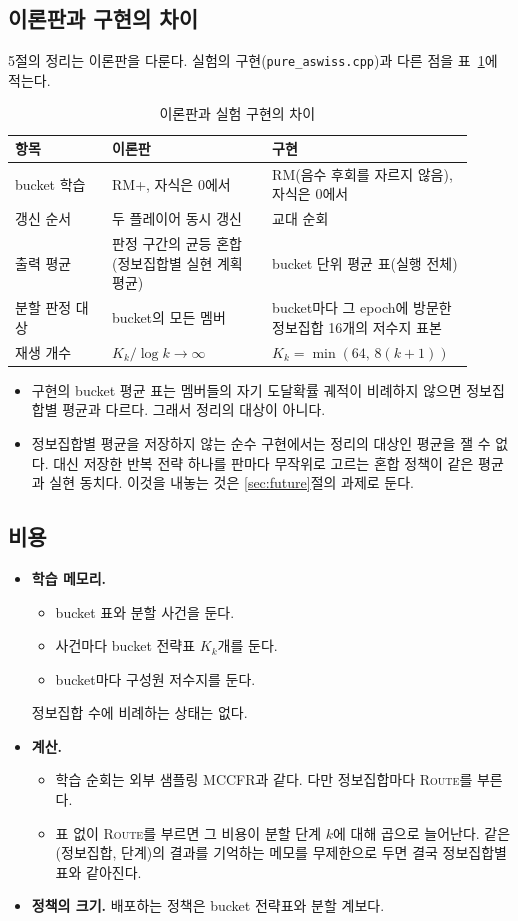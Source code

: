 \subsection{이론판과 구현의 차이}\label{sec:impl-gap}
5절의 정리는 이론판을 다룬다. 실험의 구현(\texttt{pure\_aswiss.cpp})과 다른 점을 표~\ref{tab:gap}에 적는다.
\begin{table}[h]
\centering\small
\caption{이론판과 실험 구현의 차이}\label{tab:gap}
\begin{tabular}{@{}p{0.2\linewidth}p{0.33\linewidth}p{0.38\linewidth}@{}}
\toprule
항목 & 이론판 & 구현 \\
\midrule
bucket 학습 & RM+, 자식은 0에서 & RM(음수 후회를 자르지 않음), 자식은 0에서 \\
갱신 순서 & 두 플레이어 동시 갱신 & 교대 순회 \\
출력 평균 & 판정 구간의 균등 혼합(정보집합별 실현 계획 평균) & bucket 단위 평균 표(실행 전체) \\
분할 판정 대상 & bucket의 모든 멤버 & bucket마다 그 epoch에 방문한 정보집합 16개의 저수지 표본 \\
재생 개수 & $K_k/\log k\to\infty$ & $K_k=\min(64,\,8(k+1))$ \\
\bottomrule
\end{tabular}
\end{table}
\begin{itemize}
  \item 구현의 bucket 평균 표는 멤버들의 자기 도달확률 궤적이 비례하지 않으면 정보집합별 평균과 다르다. 그래서 정리의 대상이 아니다.
  \item 정보집합별 평균을 저장하지 않는 순수 구현에서는 정리의 대상인 평균을 잴 수 없다. 대신 저장한 반복 전략 하나를 판마다 무작위로 고르는 혼합 정책이 같은 평균과 실현 동치다. 이것을 내놓는 것은 \ref{sec:future}절의 과제로 둔다.
\end{itemize}

\subsection{비용}\label{sec:cost}
\begin{itemize}
  \item \textbf{학습 메모리.}
    \begin{itemize}
      \item bucket 표와 분할 사건을 둔다.
      \item 사건마다 bucket 전략표 $K_k$개를 둔다.
      \item bucket마다 구성원 저수지를 둔다.
    \end{itemize}
    정보집합 수에 비례하는 상태는 없다.
  \item \textbf{계산.}
    \begin{itemize}
      \item 학습 순회는 외부 샘플링 MCCFR과 같다. 다만 정보집합마다 \textsc{Route}를 부른다.
      \item 표 없이 \textsc{Route}를 부르면 그 비용이 분할 단계 $k$에 대해 곱으로 늘어난다. 같은 (정보집합, 단계)의 결과를 기억하는 메모를 무제한으로 두면 결국 정보집합별 표와 같아진다.
    \end{itemize}
  \item \textbf{정책의 크기.} 배포하는 정책은 bucket 전략표와 분할 계보다.
\end{itemize}
